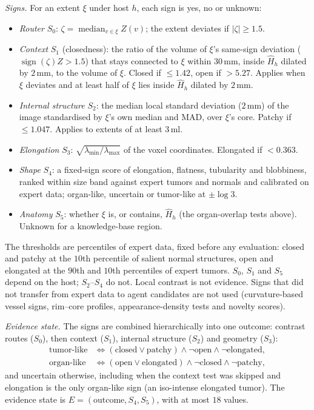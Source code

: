 \documentclass[fleqn,10pt]{olplainarticle}
\begin{document}
\emph{Signs.} For an extent $\xi$ under host $h$, each sign is yes, no or unknown:
\begin{itemize}
\item \emph{Router} $S_0$: $\zeta=\operatorname{median}_{v\in\xi}Z(v)$; the extent deviates if $|\zeta|\ge1.5$.
\item \emph{Context} $S_1$ (closedness): the ratio of the volume of $\xi$'s same-sign deviation ($\operatorname{sign}(\zeta)Z>1.5$)
that stays connected to $\xi$ within $30$\,mm, inside $\hat H_h$ dilated by $2$\,mm, to the volume of $\xi$. Closed if
$\le1.42$, open if $>5.27$. Applies when $\xi$ deviates and at least half of $\xi$ lies inside $\hat H_h$ dilated by $2$\,mm.
\item \emph{Internal structure} $S_2$: the median local standard deviation ($2$\,mm) of the image standardised by $\xi$'s own
median and MAD, over $\xi$'s core. Patchy if $\le1.047$. Applies to extents of at least $3$\,ml.
\item \emph{Elongation} $S_3$: $\sqrt{\lambda_{\min}/\lambda_{\max}}$ of the voxel coordinates. Elongated if $<0.363$.
\item \emph{Shape} $S_4$: a fixed-sign score of elongation, flatness, tubularity and blobbiness, ranked within size band
against expert tumors and normals and calibrated on expert data; organ-like, uncertain or tumor-like at $\pm\log3$.
\item \emph{Anatomy} $S_5$: whether $\xi$ is, or contains, $\hat H_h$ (the organ-overlap tests above). Unknown for a
knowledge-base region.
\end{itemize}
The thresholds are percentiles of expert data, fixed before any evaluation: closed and patchy at the $10$th percentile of
salient normal structures, open and elongated at the $90$th and $10$th percentiles of expert tumors. $S_0$, $S_1$ and $S_5$ depend
on the host; $S_2$--$S_4$ do not. Local contrast is not evidence. Signs that did not transfer from expert data to agent
candidates are not used (curvature-based vessel signs, rim--core profiles, appearance-density tests and novelty scores).

\emph{Evidence state.} The signs are combined hierarchically into one outcome: contrast routes ($S_0$), then context ($S_1$),
internal structure ($S_2$) and geometry ($S_3$):
\begin{equation}
\label{eq:tree}
\begin{aligned}
\text{tumor-like}&\iff(\text{closed}\vee\text{patchy})\wedge\neg\text{open}\wedge\neg\text{elongated},\\
\text{organ-like}&\iff(\text{open}\vee\text{elongated})\wedge\neg\text{closed}\wedge\neg\text{patchy},
\end{aligned}
\end{equation}
and uncertain otherwise, including when the context test was skipped and elongation is the only organ-like sign (an
iso-intense elongated tumor). The evidence state is $E=(\text{outcome},S_4,S_5)$, with at most $18$ values.
\end{document}
